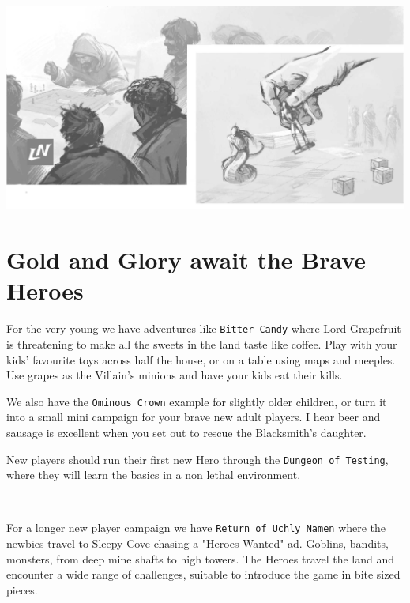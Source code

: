 \vfill

\begin{center}
\includegraphics[width=0.999\textwidth]{./fig/tabletop.jpg}
\end{center}








\clearpage %

\section*{Gold and Glory await the Brave Heroes}

\noindent
For the very young we have adventures like \texttt{Bitter Candy} where Lord Grapefruit is threatening to make all the sweets in the land taste like coffee. Play with your kids' favourite toys across half the house, or on a table using maps and meeples. Use grapes as the Villain's minions and have your kids eat their kills.

We also have the \texttt{Ominous Crown} example for slightly older children, or turn it into a small mini campaign for your brave new adult players. I hear beer and sausage is excellent when you set out to rescue the Blacksmith's daughter.

New players should run their first new Hero through the \texttt{Dungeon of Testing}, where they will learn the basics in a non lethal environment.

\

\noindent
For a longer new player campaign we have \texttt{Return of Uchly Namen} where the newbies travel to Sleepy Cove chasing a "Heroes Wanted" ad. Goblins, bandits, monsters, from deep mine shafts to high towers. The Heroes travel the land and encounter a wide range of challenges, suitable to introduce the game in bite sized pieces.

